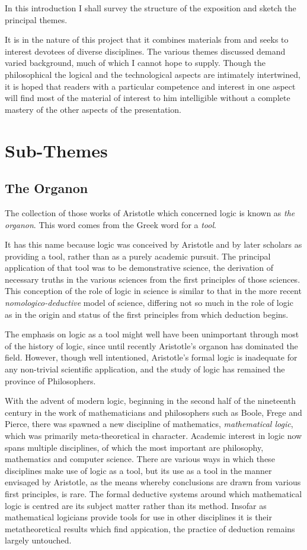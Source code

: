 In this introduction I shall survey the structure of the exposition
and sketch the principal themes.

It is in the nature of this project that it combines materials from
and seeks to interest devotees of diverse disciplines.
The various themes discussed demand varied background, much of which I
cannot hope to supply.
Though the philosophical the logical and the technological aspects are
intimately intertwined, it is hoped that readers with a particular
competence and interest in one aspect will find most of the material
of interest to him intelligible without a complete mastery of the
other aspects of the presentation.

\section{Sub-Themes}

\subsection{The Organon}

The collection of those works of Aristotle which concerned logic is
known as {\it the organon}.
This word comes from the Greek word for a {\it tool}.

It has this name because logic was conceived by Aristotle and by later
scholars as providing a tool, rather than as a purely academic
pursuit.
The principal application of that tool was to be demonstrative
science, the derivation of necessary truths in the various sciences
from the first principles of those sciences.
This conception of the role of logic in science is similar to that
in the more recent {\it nomologico-deductive} model of science,
differing not so much in the role of logic as in the origin and
status of the first principles from which deduction begins.
 
The emphasis on logic as a tool might well have been unimportant
through most of the history of logic, since until recently Aristotle's
organon has dominated the field.
However, though well intentioned, Aristotle's formal logic is
inadequate for any non-trivial scientific application, and the study
of logic has remained the province of Philosophers.

With the advent of modern logic, beginning in the second half of the
nineteenth century in the work of mathematicians and philosophers such as Boole,
Frege and Pierce, there was spawned a new discipline of mathematics,
{\it mathematical logic}, which was primarily meta-theoretical in
character.
Academic interest in logic now spans multiple disciplines, of which
the most important are philosophy, mathematics and computer science.
There are various ways in which these disciplines make use of
logic as a tool, but its use as a tool in the manner envisaged by
Aristotle, as the means whereby conclusions are drawn from various
first principles, is rare.
The formal deductive systems around which mathematical logic is centred
are its subject matter rather than its method.
Insofar as mathematical logicians provide tools for use in other
disciplines it is their metatheoretical results which find 
appication, the practice of deduction remains largely untouched.

